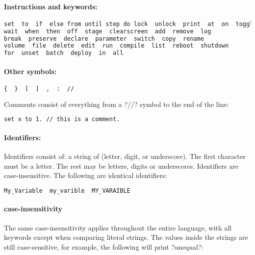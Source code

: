 \paragraph{Instructions and keywords:}

\begin{lstlisting}[frame=single,language=XML]
set  to  if  else from until step do lock  unlock  print  at  on  toggle
wait  when  then  off  stage  clearscreen  add  remove  log
break  preserve  declare  parameter  switch  copy  rename
volume  file  delete  edit  run  compile  list  reboot  shutdown
for  unset  batch  deploy  in  all
\end{lstlisting}

\paragraph{Other symbols:}

\begin{lstlisting}[frame=single,language=XML]
{  }  [  ]  ,  :  //
\end{lstlisting}

Comments consist of everything from a ?//? symbol to the end of the line:

\begin{lstlisting}[frame=single,language=XML]
set x to 1. // this is a comment.
\end{lstlisting}

\paragraph{Identifiers:} Identifiers consist of: a string of (letter, digit, or underscore). The first character must be a letter. The rest may be letters, digits or underscores. Identifiers are case-insensitive. The following are identical identifiers:

\begin{lstlisting}[frame=single,language=XML]
My_Variable  my_varible  MY_VARAIBLE
\end{lstlisting}

\paragraph{case-insensitivity}
The same case-insensitivity applies throughout the entire language, with all keywords except when comparing literal strings. The values inside the strings are still case-sensitive, for example, the following will print ?unequal?:

